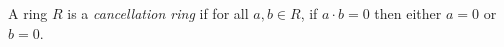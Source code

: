 \documentclass[12pt]{article}
\begin{document}
A ring $R$ is a {\em cancellation ring} if for all $a,b \in R$, if $a \cdot b = 0$ then either $a=0$ or $b=0$.
\end{document}
